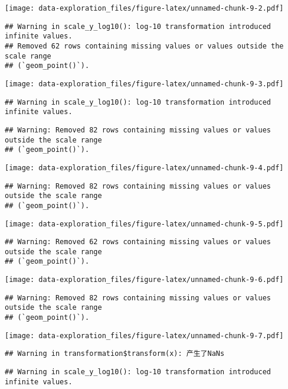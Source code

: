 \documentclass[
]{article}
\begin{document}
\texttt{[image: data-exploration\_files/figure-latex/unnamed-chunk-9-2.pdf]}

\begin{verbatim}
## Warning in scale_y_log10(): log-10 transformation introduced infinite values.
## Removed 62 rows containing missing values or values outside the scale range
## (`geom_point()`).
\end{verbatim}

\texttt{[image: data-exploration\_files/figure-latex/unnamed-chunk-9-3.pdf]}

\begin{verbatim}
## Warning in scale_y_log10(): log-10 transformation introduced infinite values.
\end{verbatim}

\begin{verbatim}
## Warning: Removed 82 rows containing missing values or values outside the scale range
## (`geom_point()`).
\end{verbatim}

\texttt{[image: data-exploration\_files/figure-latex/unnamed-chunk-9-4.pdf]}

\begin{verbatim}
## Warning: Removed 82 rows containing missing values or values outside the scale range
## (`geom_point()`).
\end{verbatim}

\texttt{[image: data-exploration\_files/figure-latex/unnamed-chunk-9-5.pdf]}

\begin{verbatim}
## Warning: Removed 62 rows containing missing values or values outside the scale range
## (`geom_point()`).
\end{verbatim}

\texttt{[image: data-exploration\_files/figure-latex/unnamed-chunk-9-6.pdf]}

\begin{verbatim}
## Warning: Removed 82 rows containing missing values or values outside the scale range
## (`geom_point()`).
\end{verbatim}

\texttt{[image: data-exploration\_files/figure-latex/unnamed-chunk-9-7.pdf]}

\begin{verbatim}
## Warning in transformation$transform(x): 产生了NaNs
\end{verbatim}

\begin{verbatim}
## Warning in scale_y_log10(): log-10 transformation introduced infinite values.
\end{verbatim}
\end{document}
